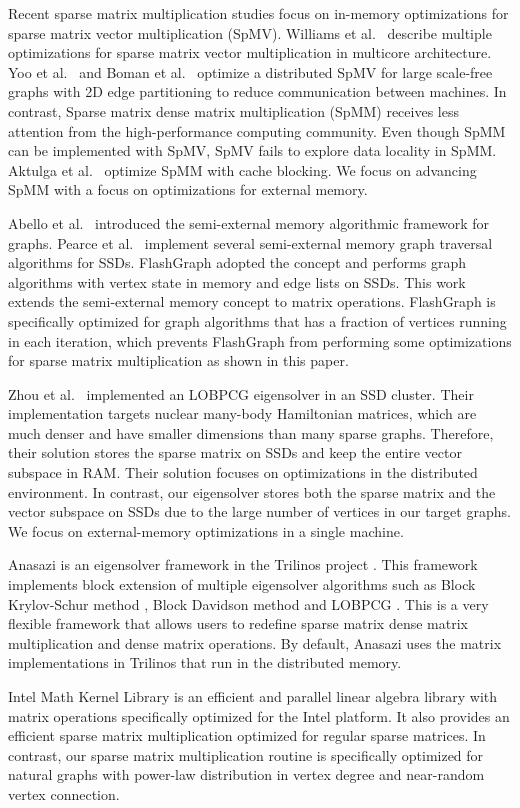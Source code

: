 Recent sparse matrix multiplication studies focus on in-memory optimizations
for sparse matrix vector multiplication (SpMV).
Williams et al.~\cite{Williams07} describe multiple optimizations for sparse matrix
vector multiplication in multicore architecture. Yoo et al.~\cite{Yoo11}
and Boman et al.~\cite{Boman2013} optimize a distributed SpMV for large
scale-free graphs with 2D edge partitioning to reduce communication between
machines. In contrast, Sparse matrix dense matrix multiplication (SpMM) receives
less attention from the high-performance computing community. Even though
SpMM can be implemented with SpMV, SpMV fails to explore data locality in SpMM.
Aktulga et al.~\cite{Aktulga14} optimize SpMM with cache blocking. We focus on
advancing SpMM with a focus on optimizations for external memory.

Abello et al.~\cite{Abello98} introduced the semi-external memory algorithmic
framework for graphs.  Pearce et al.~\cite{Pearce10} implement several 
semi-external memory graph traversal algorithms for SSDs. FlashGraph
\cite{flashgraph} adopted the concept and performs graph algorithms with
vertex state in memory and edge lists on SSDs. This work extends the semi-external
memory concept to matrix operations. FlashGraph is specifically optimized for
graph algorithms that has a fraction of vertices running in each iteration,
which prevents FlashGraph from performing some optimizations for sparse
matrix multiplication as shown in this paper.

Zhou et al.~\cite{Zhou12} implemented an LOBPCG \cite{Arbenz05} eigensolver in
an SSD cluster. Their implementation targets nuclear many-body Hamiltonian
matrices, which are much denser and have smaller dimensions than many sparse
graphs. Therefore, their solution stores the sparse matrix on SSDs and keep
the entire vector subspace in RAM. Their solution focuses on optimizations
in the distributed environment. In contrast, our eigensolver stores both
the sparse matrix and the vector subspace on SSDs due to the large number
of vertices in our target graphs. We focus on external-memory optimizations
in a single machine.

Anasazi \cite{anasazi} is an eigensolver framework in the Trilinos project
\cite{trilinos}. This framework implements block extension of multiple
eigensolver algorithms
such as Block Krylov-Schur method \cite{krylovschur}, Block Davidson method
\cite{Arbenz05} and LOBPCG \cite{Arbenz05}. This is a very flexible framework
that allows users to redefine sparse matrix dense matrix multiplication and
dense matrix operations. By default, Anasazi uses the matrix implementations
in Trilinos that run in the distributed memory.

Intel Math Kernel Library \cite{mkl} is an efficient and parallel linear
algebra library with matrix operations specifically optimized for the Intel
platform. It also provides an efficient sparse matrix multiplication optimized
for regular sparse matrices. In contrast, our sparse matrix multiplication
routine is specifically optimized for natural graphs with power-law distribution
in vertex degree and near-random vertex connection.
